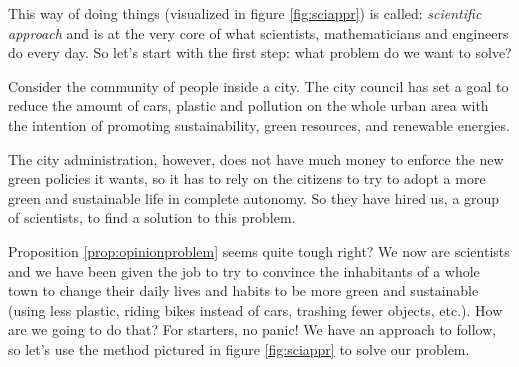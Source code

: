 %
\begin{figure*}[h]
  
  \caption[Phases of problem solving]{Illustration of the different phases in the scientific approach to solve a problem.
  Each one of them is executed with different tools and require different skills.}
  \label{fig:sciappr}%
\end{figure*}
%

This way of doing things (visualized in figure \ref{fig:sciappr})
is called: \textit{scientific approach} and is at the very core
of what scientists, mathematicians and engineers do every day. So let's start
with the first step: what problem do we want to solve?

\begin{proposition}
\label{prop:opinionproblem}
Consider the community of people inside a city. The city council has set a goal to reduce
the amount of cars, plastic and pollution on the whole urban area with the intention of
promoting sustainability, green resources, and renewable energies.

The city administration, however, does not have much money to enforce the new green policies
it wants, so it has to rely on the citizens to try to adopt a more green and sustainable life
in complete autonomy. So they have hired us, a group of scientists, to find a solution to
this problem.
\end{proposition}

Proposition \ref{prop:opinionproblem} seems quite tough right? We now are scientists and we
have been given the job to try to convince the inhabitants of a whole town to change their
daily lives and habits to be more green and sustainable (using less plastic, riding bikes instead of
cars, trashing fewer objects, etc.). How are we going to do that?
For starters, no panic! We have an approach to follow, so let's use the method pictured in figure
\ref{fig:sciappr} to solve our problem.\\

